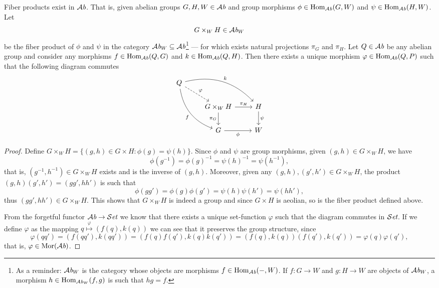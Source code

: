 \begin{proposition}
  Fiber products exist in \({\mathcal{A}\textit{b}}\). That is, given abelian groups \(G, H, W \in
  {\mathcal{A}\textit{b}}\) and group morphisms \(\phi \in \operatorname{Hom}_{\mathcal{A}\textit{b}}(G, W)\) and \(\psi \in
  \operatorname{Hom}_{\mathcal{A}\textit{b}}(H, W)\). Let
  \[
    G \times_W H \in {\mathcal{A}\textit{b}}_W
  \]
  be the fiber product of \(\phi\) and \(\psi\) in the category \({\mathcal{A}\textit{b}}_W
  \subseteq {\mathcal{A}\textit{b}}\)\footnote{As a reminder: \({\mathcal{A}\textit{b}}_W\) is the category whose
  objects are morphisms \(f \in \operatorname{Hom}_{\mathcal{A}\textit{b}}(-, W)\). If \(f: G \to W\) and \(g: H
  \to W\) are objects of \({\mathcal{A}\textit{b}}_W\), a morphism \(h \in \operatorname{Hom}_{{\mathcal{A}\textit{b}}_W}(f, g)\) is
  such that \(hg = f\).}
  --- for which exists natural projections \(\pi_G\) and \(\pi_H\). Let \(Q \in
  {\mathcal{A}\textit{b}}\) be any abelian group and consider any morphisms \(f \in \operatorname{Hom}_{\mathcal{A}\textit{b}}(Q, G)\)
  and \(k \in \operatorname{Hom}_{\mathcal{A}\textit{b}}(Q, H)\). Then there exists a unique morphism \(\varphi
  \in \operatorname{Hom}_{\mathcal{A}\textit{b}}(Q, P)\) such that the following diagram commutes
  \[
    \begin{tikzcd}
      Q \ar[dr, dashed, "\varphi"] \ar[ddr, bend right, swap, "f"]
      \ar[drr, bend left, "k"]
      & & \\
      &G \times_W H \ar[r, "\pi_H"] \ar[d, swap, "\pi_G"] &H \ar[d, "\psi"] \\
      &G \ar[r, swap, "\phi"] &W
    \end{tikzcd}
  \]
\end{proposition}

\begin{proof}
  Define \(G \times_W H = \{(g, h) \in G \times H : \phi(g) = \psi(h)\}\). Since
  \(\phi\) and \(\psi\) are group morphisms, given \((g, h) \in G \times_W H\),
  we have
  \[
    \phi(g^{-1}) = \phi(g)^{-1} = \psi(h)^{-1} = \psi(h^{-1}),
  \]
  that is, \((g^{-1}, h^{-1}) \in G \times_W H\) exists and is the inverse of
  \((g, h)\). Moreover, given any \((g, h), (g', h') \in G \times_W H\), the
  product \((g, h)(g', h') = (gg', hh')\) is such that
  \[
    \phi(gg') = \phi(g) \phi(g') = \psi(h) \psi(h') = \psi(hh'),
  \]
  thus \((gg', hh') \in G \times_W H\). This shows that \(G \times_W H\) is
  indeed a group and since \(G \times H\) is aeolian, so is the fiber product
  defined above.

  From the forgetful functor \({\mathcal{A}\textit{b}} \to {\mathcal{S}\textit{et}}\) we know that there exists a unique
  set-function \(\varphi\) such that the diagram commutes in \({\mathcal{S}\textit{et}}\). If we
  define \(\varphi\) as the mapping \(q \overset \varphi \longmapsto (f(q),
  k(q))\) we can see that it preserves the group structure, since
  \[
    \varphi(qq') = (f(qq'), k(qq')) = (f(q)f(q'), k(q)k(q'))
    = (f(q), k(q))(f(q'), k(q')) = \varphi(q) \varphi(q'),
  \]
  that is, \(\varphi \in \operatorname{Mor}({\mathcal{A}\textit{b}})\).
\end{proof}


